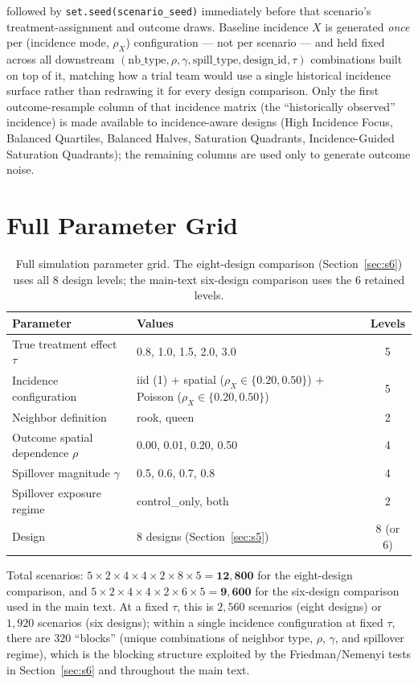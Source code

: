 \documentclass[11pt]{article}
\begin{document}
followed by \texttt{set.seed(scenario\_seed)} immediately before that scenario's
treatment-assignment and outcome draws. Baseline incidence $X$ is generated
\emph{once} per (incidence mode, $\rho_X$) configuration --- not per scenario ---
and held fixed across all downstream $(\text{nb\_type}, \rho, \gamma,
\text{spill\_type}, \text{design\_id}, \tau)$ combinations built on top of it,
matching how a trial team would use a single historical incidence surface rather
than redrawing it for every design comparison. Only the first outcome-resample
column of that incidence matrix (the ``historically observed'' incidence) is made
available to incidence-aware designs (High Incidence Focus, Balanced Quartiles,
Balanced Halves, Saturation Quadrants, Incidence-Guided Saturation Quadrants);
the remaining columns are used only to generate outcome noise.

\section{Full Parameter Grid}
\label{sec:s2}

\begin{table}[h]
\centering
\caption{Full simulation parameter grid. The eight-design comparison
(Section~\ref{sec:s6}) uses all 8 design levels; the main-text six-design
comparison uses the 6 retained levels.}
\begin{tabular}{p{4.4cm}p{7.3cm}c}
\toprule
Parameter & Values & Levels \\
\midrule
True treatment effect $\tau$ & 0.8, 1.0, 1.5, 2.0, 3.0 & 5 \\
Incidence configuration & iid (1) + spatial ($\rho_X\in\{0.20,0.50\}$) + Poisson ($\rho_X\in\{0.20,0.50\}$) & 5 \\
Neighbor definition & rook, queen & 2 \\
Outcome spatial dependence $\rho$ & 0.00, 0.01, 0.20, 0.50 & 4 \\
Spillover magnitude $\gamma$ & 0.5, 0.6, 0.7, 0.8 & 4 \\
Spillover exposure regime & control\_only, both & 2 \\
Design & 8 designs (Section~\ref{sec:s5}) & 8 (or 6) \\
\bottomrule
\end{tabular}
\end{table}

Total scenarios: $5 \times 2 \times 4 \times 4 \times 2 \times 8 \times 5 =
\mathbf{12{,}800}$ for the eight-design comparison, and $5 \times 2 \times 4
\times 4 \times 2 \times 6 \times 5 = \mathbf{9{,}600}$ for the six-design
comparison used in the main text. At a fixed $\tau$, this is $2{,}560$
scenarios (eight designs) or $1{,}920$ scenarios (six designs); within a single
incidence configuration at fixed $\tau$, there are $320$ ``blocks'' (unique
combinations of neighbor type, $\rho$, $\gamma$, and spillover regime), which is
the blocking structure exploited by the Friedman/Nemenyi tests in
Section~\ref{sec:s6} and throughout the main text.
\end{document}
